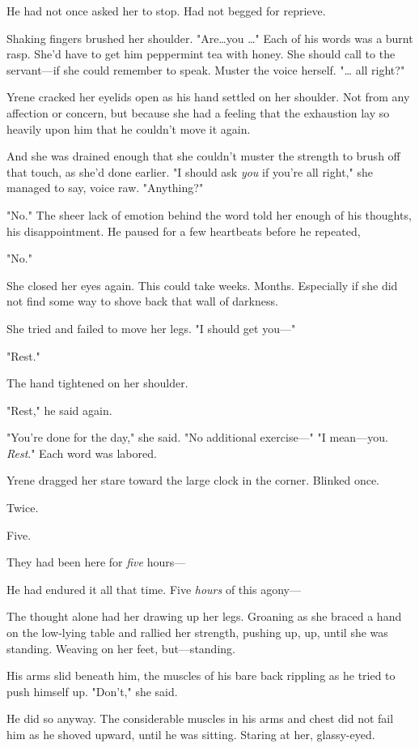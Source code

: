 He had not once asked her to stop.
Had not begged for reprieve.

Shaking fingers brushed her shoulder.
"Are\ldots you \ldots" Each of his words was a burnt rasp.
She'd have to get him peppermint tea with honey.
She should call to the servant---if she could remember to speak.
Muster the voice herself.
"\ldots{} all right?"

Yrene cracked her eyelids open as his hand settled on her shoulder.
Not from any affection or concern, but because she had a feeling that the exhaustion lay so heavily upon him that he couldn't move it again.

And she was drained enough that she couldn't muster the strength to brush off that touch, as she'd done earlier.
"I should ask \emph{you}
if you're all right," she managed to say, voice raw.
"Anything?"

"No."
The sheer lack of emotion behind the word told her enough of his thoughts, his disappointment.
He paused for a few heartbeats before he repeated,

"No."

She closed her eyes again.
This could take weeks.
Months.
Especially if she did not find some way to shove back that wall of darkness.

She tried and failed to move her legs.
"I should get you---"

"Rest."

The hand tightened on her shoulder.

"Rest," he said again.

"You're done for the day," she said.
"No additional exercise---" "I mean---you.
\emph{Rest}."
Each word was labored.

Yrene dragged her stare toward the large clock in the corner.
Blinked once.

Twice.

Five.

They had been here for \emph{five} hours---

He had endured it all that time.
Five \emph{hours} of this agony---

The thought alone had her drawing up her legs.
Groaning as she braced a hand on the low-lying table and rallied her strength, pushing up, up, until she was standing.
Weaving on her feet, but---standing.

His arms slid beneath him, the muscles of his bare back rippling as he tried to push himself up.
"Don't," she said.

He did so anyway.
The considerable muscles in his arms and chest did not fail him as he shoved upward, until he was sitting.
Staring at her, glassy-eyed.

